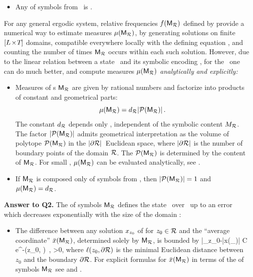 \documentclass[12pt]{iopart}
\begin{document}
\begin{itemize}
\item   Any {\brick}  of symbols from  \Ai\ is {\admissible}.
\end{itemize}

For any general {\spt} ergodic system, relative frequencies $f(\mathsf{M}_{\mathcal{R}})$
defined by  provide a numerical way to
estimate measures ${\mu}(\mathsf{M}_{\mathcal{R}})$, by generating solutions on finite
$[{L_{}}\!\times\!{T_{}}]$ domains, compatible everywhere locally with the defining
equation , and counting the number of times $\mathsf{M}_{\mathcal{R}}$
occurs within each such solution.
However, due to the linear relation between a {\spt} state \Xx\ and its
symbolic encoding \Mm, for the \catlatt\ one can do much better, and compute
measures ${\mu}(\mathsf{M}_{\mathcal{R}})$ \emph{analytically and explicitly:}

\begin{itemize}

\item   Measures of \brick s $ \mathsf{M}_{\mathcal{R}}$ are given by rational numbers
and factorize  into products of constant and geometrical parts:
\[
{\mu}(\mathsf{M}_{\mathcal{R}})= d_{\mathcal{R}}|\mathcal{P}(\mathsf{M}_{\mathcal{R}})|
\,.
\]
The constant $d_{\mathcal{R}}$ depends only , independent of  the
symbolic content $M_{\mathcal{R}}$. The factor  $|\mathcal{P}(\mathsf{M}_{\mathcal{R}})|$ admits
geometrical interpretation as  the volume of polytope $\mathcal{P}(\mathsf{M}_{\mathcal{R}})$  in
the $|\partial \mathcal{R}|$\dmn\ Euclidean space, where $|\partial \mathcal{R}|$ is the
number of boundary points of the domain $\mathcal{R}$.   The  
$\mathcal{P}(\mathsf{M}_{\mathcal{R}})$ is determined by the content of $ \mathsf{M}_{\mathcal{R}}$. For small
\edit{$|\R|$}, ${\mu}(\mathsf{M}_{\mathcal{R}})$ can be evaluated analytically, see
.

\item   If $\mathsf{M}_{\mathcal{R}}$  is composed only of  symbols from  \Ai,
then  $|\mathcal{P}(\mathsf{M}_{\mathcal{R}})|=1$ and ${\mu}(\mathsf{M}_{\mathcal{R}})=d_{\mathcal{R}}$.
\end{itemize}

\bigskip

\noindent \textbf{Answer to Q2.}  The {\brick}  of  symbols $\mathsf{M}_{\mathcal{R}}$ defines the
{\spt} state \Xx\ over \R\ up to an error which decreases exponentially
with the size of the domain \R:

\begin{itemize}
\item The difference between any solution  $x_{z_0} $ of 
for $z_0 \in \mathcal{R}$ and the  ``average coordinate''  $ \bar{x}({\mathsf{M}_{\mathcal{R}}})$,
determined solely by $\mathsf{M}_{\mathcal{R}}$, is bounded by
 \beq
  |\ssp_{z_0}-\bar{x}({\Mm_\R})| \leq C e^{-\nu \ell (z_0, \partial \R)}
  \,, \qquad \nu >0,
where $\ell(z_0, \partial \mathcal{R})$ is the minimal Euclidean distance between
$z_0$ and the  boundary $\partial \mathcal{R}$.
For explicit formulas for $\bar{x}({\mathsf{M}_{\mathcal{R}}})$ in terms of the {\brick} of
symbols ${\mathsf{M}_{\mathcal{R}}}$ see  and .
\end{itemize}
\end{document}

